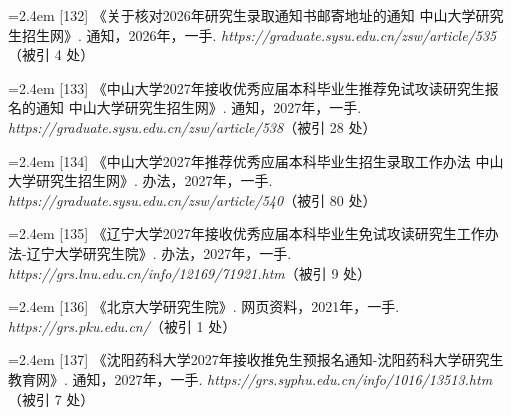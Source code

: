 {\vspace{0.6pt}
\noindent\hangindent=2.4em \label{src:S0165}{\color{cAccent}[132]} 《关于核对2026年研究生录取通知书邮寄地址的通知 \textbar{} 中山大学研究生招生网》. 通知，2026年，一手. \textit{https://graduate.sysu.edu.cn/zsw/article/535}（被引 4 处）\par
\vspace{0.6pt}
\noindent\hangindent=2.4em \label{src:S0166}{\color{cAccent}[133]} 《中山大学2027年接收优秀应届本科毕业生推荐免试攻读研究生报名的通知 \textbar{} 中山大学研究生招生网》. 通知，2027年，一手. \textit{https://graduate.sysu.edu.cn/zsw/article/538}（被引 28 处）\par
\vspace{0.6pt}
\noindent\hangindent=2.4em \label{src:S0167}{\color{cAccent}[134]} 《中山大学2027年推荐优秀应届本科毕业生招生录取工作办法 \textbar{} 中山大学研究生招生网》. 办法，2027年，一手. \textit{https://graduate.sysu.edu.cn/zsw/article/540}（被引 80 处）\par
\vspace{0.6pt}
\vspace{3.5pt}\par
\nopagebreak\vspace{1pt}
\noindent\hangindent=2.4em \label{src:S0168}{\color{cAccent}[135]} 《辽宁大学2027年接收优秀应届本科毕业生免试攻读研究生工作办法-辽宁大学研究生院》. 办法，2027年，一手. \textit{https://grs.lnu.edu.cn/info/12169/71921.htm}（被引 9 处）\par
\vspace{0.6pt}
\vspace{3.5pt}\par
\nopagebreak\vspace{1pt}
\noindent\hangindent=2.4em \label{src:S0169}{\color{cAccent}[136]} 《北京大学研究生院》. 网页资料，2021年，一手. \textit{https://grs.pku.edu.cn/}（被引 1 处）\par
\vspace{0.6pt}
\vspace{3.5pt}\par
\nopagebreak\vspace{1pt}
\noindent\hangindent=2.4em \label{src:S0170}{\color{cAccent}[137]} 《沈阳药科大学2027年接收推免生预报名通知-沈阳药科大学研究生教育网》. 通知，2027年，一手. \textit{https://grs.syphu.edu.cn/info/1016/13513.htm}（被引 7 处）\par
}
